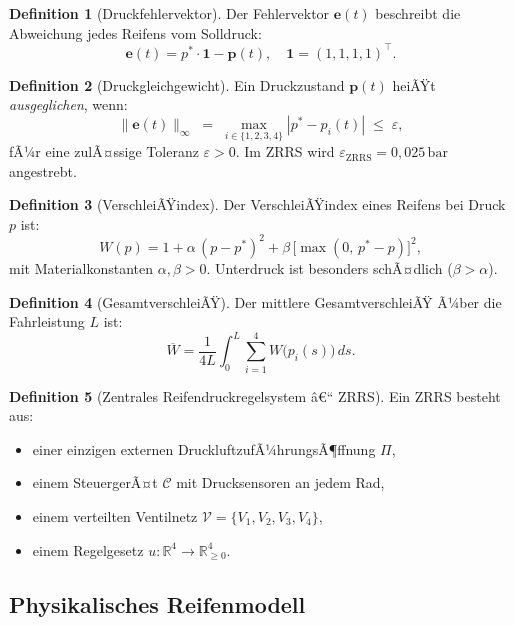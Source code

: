 ﻿\documentclass[a4paper,12pt]{article}
\theoremstyle{definition}
\newtheorem{definition}{Definition}
\begin{document}
\begin{definition}[Druckfehlervektor]
Der Fehlervektor $\mathbf{e}(t)$ beschreibt die Abweichung jedes Reifens vom
Solldruck:
\[
    \mathbf{e}(t) = p^* \cdot \mathbf{1} - \mathbf{p}(t),
    \quad \mathbf{1} = (1,1,1,1)^{\top}.
\]
\end{definition}

\begin{definition}[Druckgleichgewicht]
Ein Druckzustand $\mathbf{p}(t)$ heiÃŸt \emph{ausgeglichen}, wenn:
\[
    \|\mathbf{e}(t)\|_\infty \;=\; \max_{i \in \{1,2,3,4\}} |p^* - p_i(t)|
    \;\leq\; \varepsilon,
\]
fÃ¼r eine zulÃ¤ssige Toleranz $\varepsilon > 0$. Im ZRRS wird
$\varepsilon_{\text{ZRRS}} = 0{,}025\,\text{bar}$ angestrebt.
\end{definition}

\begin{definition}[VerschleiÃŸindex]
Der VerschleiÃŸindex eines Reifens bei Druck $p$ ist:
\[
    W(p) = 1 + \alpha\,(p - p^*)^2 + \beta\,\bigl[\max(0,\, p^* - p)\bigr]^2,
\]
mit Materialkonstanten $\alpha, \beta > 0$. Unterdruck ist besonders
schÃ¤dlich ($\beta > \alpha$).
\end{definition}

\begin{definition}[GesamtverschleiÃŸ]
Der mittlere GesamtverschleiÃŸ Ã¼ber die Fahrleistung $L$ ist:
\[
    \overline{W} = \frac{1}{4L} \int_0^L \sum_{i=1}^{4} W\bigl(p_i(s)\bigr)\, ds.
\]
\end{definition}

\begin{definition}[Zentrales Reifendruckregelsystem â€“ ZRRS]
Ein ZRRS besteht aus:
\begin{itemize}
    \item einer einzigen externen DruckluftzufÃ¼hrungsÃ¶ffnung $\Pi$,
    \item einem SteuergerÃ¤t $\mathcal{C}$ mit Drucksensoren an jedem Rad,
    \item einem verteilten Ventilnetz $\mathcal{V} = \{V_1, V_2, V_3, V_4\}$,
    \item einem Regelgesetz $u: \mathbb{R}^4 \to \mathbb{R}_{\geq 0}^4$.
\end{itemize}
\end{definition}

\subsection{Physikalisches Reifenmodell}
\end{document}
